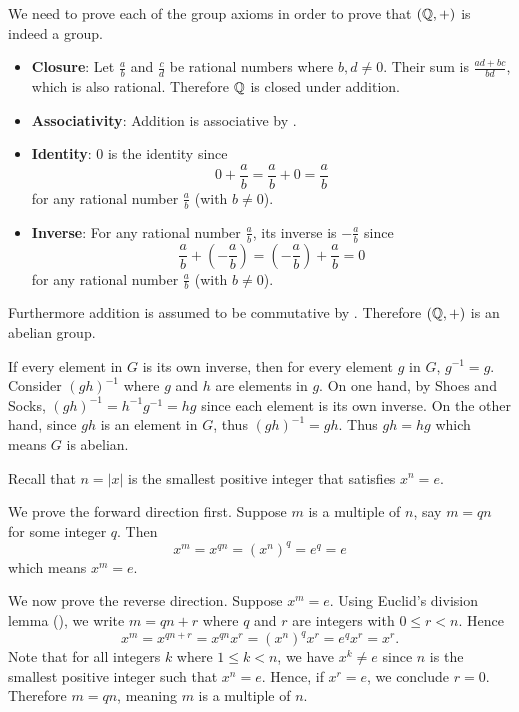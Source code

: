 \begin{questions}
    \item We need to prove each of the group axioms in order to prove that $(\mathbb{Q}, +)$ is indeed a group.
    \begin{itemize}
        \item \textbf{Closure}: Let $\frac ab$ and $\frac cd$ be rational numbers where $b, d \neq 0$. Their sum is $\frac{ad+bc}{bd}$, which is also rational. Therefore $\mathbb{Q}$ is closed under addition.
        
        \item \textbf{Associativity}: Addition is associative by .
        
        \item \textbf{Identity}: 0 is the identity since
        \[
            0 + \frac ab = \frac ab + 0 = \frac ab
        \]
        for any rational number $\frac ab$ (with $b \neq 0$).
        
        \item \textbf{Inverse}: For any rational number $\frac ab$, its inverse is $-\frac ab$ since
        \[
            \frac ab + \left(-\frac ab\right) = \left(-\frac ab\right) + \frac ab = 0
        \]
        for any rational number $\frac ab$ (with $b \neq 0$).
    \end{itemize}
    Furthermore addition is assumed to be commutative by . Therefore $(\mathbb{Q}, +)$ is an abelian group.

    \item If every element in $G$ is its own inverse, then for every element $g$ in $G$, $g^{-1} = g$. Consider $(gh)^{-1}$ where $g$ and $h$ are elements in $g$. On one hand, by Shoes and Socks, $(gh)^{-1} = h^{-1}g^{-1} = hg$ since each element is its own inverse. On the other hand, since $gh$ is an element in $G$, thus $(gh)^{-1} = gh$. Thus $gh = hg$ which means $G$ is abelian.
    
    \item Recall that $n = |x|$ is the smallest positive integer that satisfies $x^n = e$.
    
    We prove the forward direction first. Suppose $m$ is a multiple of $n$, say $m = qn$ for some integer $q$. Then
    \[
        x^m = x^{qn} = \left(x^n\right)^q = e^q = e    
    \]
    which means $x^m = e$.
    
    We now prove the reverse direction. Suppose $x^m = e$. Using Euclid's division lemma (), we write $m = qn + r$ where $q$ and $r$ are integers with $0 \leq r < n$. Hence
    \[
        x^m = x^{qn + r} = x^{qn}x^r = \left(x^n\right)^qx^r = e^qx^r = x^r.
    \]
    Note that for all integers $k$ where $1 \leq k < n$, we have $x^k \neq e$ since $n$ is the smallest positive integer such that $x^n = e$. Hence, if $x^r = e$, we conclude $r = 0$. Therefore $m = qn$, meaning $m$ is a multiple of $n$.


\end{questions}
